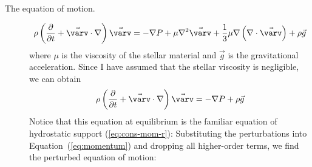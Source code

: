 \begin{description}
    \item[The equation of motion.] 
    \begin{equation} 
        \rho
        \left(
            \frac{\partial}{\partial t}
            +
            \vec{\varv}
            \cdot
            \nabla 
        \right)
        \vec{\varv}
        =
        -\nabla P
        +
        \mu \nabla^2 \vec{\varv}
        +
        \frac{1}{3} \mu \nabla\left(
            \nabla \cdot \vec{\varv}
        \right)
        +
        \rho \vec{g}
    \end{equation}
    where $\mu$ is the viscosity of the stellar material and $\vec{g}$ is the gravitational acceleration.
    Since I have assumed that the stellar viscosity is negligible, we can obtain 
    \begin{equation} \label{eq:momentum} %
        \rho
        \left(
            \frac{\partial}{\partial t}
            +
            \vec{\varv}
            \cdot
            \nabla 
        \right)
        \vec{\varv}
        =
        -
        \nabla P
        +
        \rho \vec g%
    \end{equation}
    Notice that this equation at equilibrium is the familiar equation of hydrostatic support (\ref{eq:cons-mom-r}):
    Substituting the perturbations into Equation~(\ref{eq:momentum}) and dropping all higher-order terms, we find the perturbed equation of motion:
    

\end{description}

